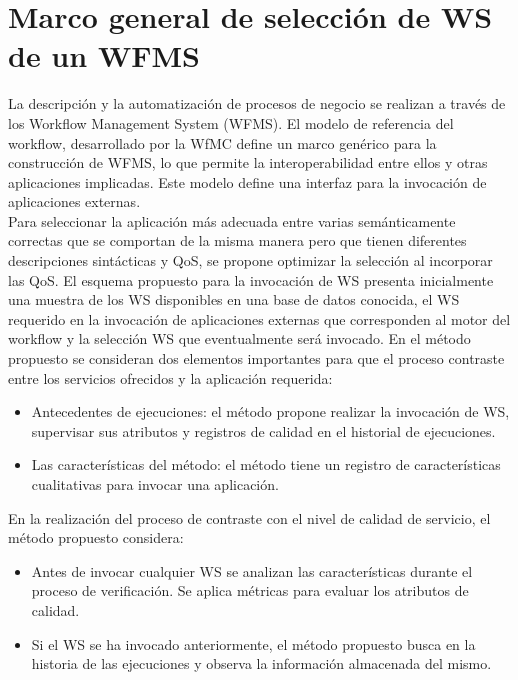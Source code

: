 \section{Marco general de selección de WS de un WFMS}
\label{Marco general de selección de WS de un WFMS}

La descripción y la automatización de procesos de negocio se realizan a través de los Workflow Management System (WFMS). El modelo de referencia del workflow, desarrollado por la WfMC define un marco genérico para la construcción de WFMS, lo que permite la interoperabilidad entre ellos y otras aplicaciones implicadas. Este modelo define una interfaz para la invocación de aplicaciones externas. \\
Para seleccionar la aplicación más adecuada entre varias semánticamente correctas que se comportan de la misma manera pero que tienen diferentes descripciones sintácticas y QoS, se propone optimizar la selección al incorporar las QoS. El esquema propuesto para la invocación de WS presenta inicialmente una muestra de los WS disponibles en una base de datos conocida, el WS requerido en la invocación de aplicaciones externas que corresponden al motor del workflow y la selección WS que eventualmente será invocado. En el método propuesto se consideran dos elementos importantes para que el proceso contraste entre los servicios ofrecidos y la aplicación requerida:

\begin{itemize}
	\item Antecedentes de ejecuciones: el método propone realizar la invocación de WS, supervisar sus atributos y registros de calidad en el historial de ejecuciones.
	\item Las características del método: el método tiene un registro de características cualitativas para invocar una aplicación.
\end{itemize}

En la realización del proceso de contraste con el nivel de calidad de servicio, el método propuesto considera:

\begin{itemize}
	\item Antes de invocar cualquier WS se analizan las características durante el proceso de verificación. Se aplica métricas para evaluar los atributos de calidad.
	\item Si el WS se ha invocado anteriormente, el método propuesto busca en la historia de las ejecuciones y observa la información almacenada del mismo.
\end{itemize}

